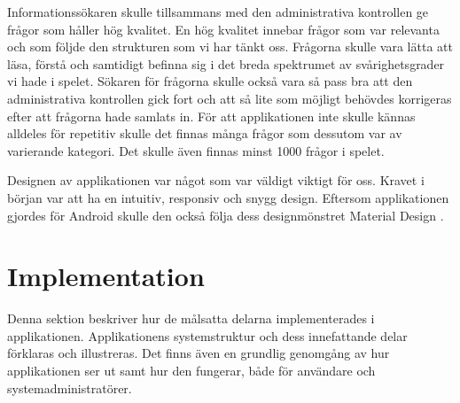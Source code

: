 \documentclass[a4paper, 11pt]{article}
\begin{document}
Informationssökaren skulle tillsammans med den administrativa kontrollen ge frågor som håller hög kvalitet. En hög kvalitet innebar frågor som var relevanta och som följde den strukturen som vi har tänkt oss. Frågorna skulle vara lätta att läsa, förstå och samtidigt befinna sig i det breda spektrumet av svårighetsgrader vi hade i spelet. Sökaren för frågorna skulle också vara så pass bra att den administrativa kontrollen gick fort och att så lite som möjligt behövdes korrigeras efter att frågorna hade samlats in. För att applikationen inte skulle kännas alldeles för repetitiv skulle det finnas många frågor som dessutom var av varierande kategori. Det skulle även finnas minst 1000 frågor i spelet.

Designen av applikationen var något som var väldigt viktigt för oss. Kravet i början var att ha en intuitiv, responsiv och snygg design. Eftersom applikationen gjordes för Android skulle den också följa dess designmönstret Material Design \cite{MaterialDesign}.



\section{Implementation}
Denna sektion beskriver hur de målsatta delarna implementerades i applikationen. Applikationens systemstruktur och dess innefattande delar  förklaras och illustreras. Det finns även en grundlig genomgång av hur applikationen ser ut samt hur den fungerar, både för användare och systemadministratörer.
\end{document}
